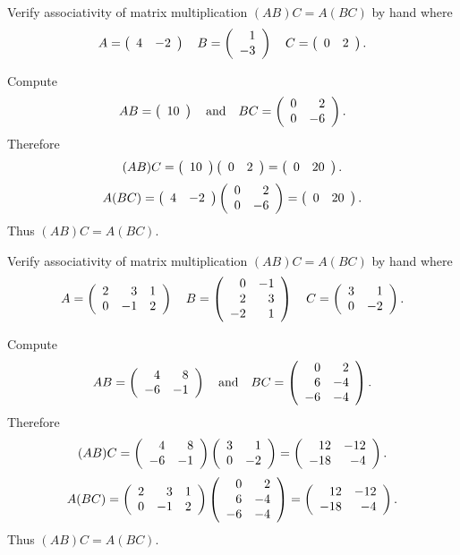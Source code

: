 \documentclass{ximera}
\begin{document}
\begin{exercise} \label{YZ_3.6_assoc1}
Verify associativity of matrix multiplication $(AB)C=A(BC)$ by hand where
\[
A=\Matrix{4&-2} \quad  B=\Matrix{1\\-3} \quad C=\Matrix{0&2}.
\]

\begin{solution}
\soln Compute
\[
AB=\Matrix{10} \AND BC=\Matrix{0&2\\0&-6}.
\]
Therefore
\[
(AB)C=\Matrix{10}\Matrix{0&2}=\Matrix{0&20}.
\]
\[
A(BC)=\Matrix{4&-2}\Matrix{0&2\\0&-6}=\Matrix{0&20}.
\]
Thus $(AB)C=A(BC)$.
\end{solution}
\end{exercise}


\begin{exercise}\label{YZ_3.6_assoc2}
Verify associativity of matrix multiplication $(AB)C=A(BC)$ by hand where
\[
A=\Matrix{2&3&1\\0&-1&2} \quad B=\Matrix{0&-1\\2&3\\-2&1} \quad C=\Matrix{3&1\\0&-2}.
\]

\begin{solution}
\soln Compute
\[
AB=\Matrix{4&8\\-6&-1} \AND BC=\Matrix{0&2\\6&-4\\-6&-4}.
\]
Therefore
\[
(AB)C=\Matrix{4&8\\-6&-1}\Matrix{3&1\\0&-2}=\Matrix{12&-12\\-18&-4}.
\]
\[
A(BC)=\Matrix{2&3&1\\0&-1&2}\Matrix{0&2\\6&-4\\-6&-4}=\Matrix{12&-12\\-18&-4}.
\]
Thus $(AB)C=A(BC)$.
\end{solution}
\end{exercise}
\end{document}
